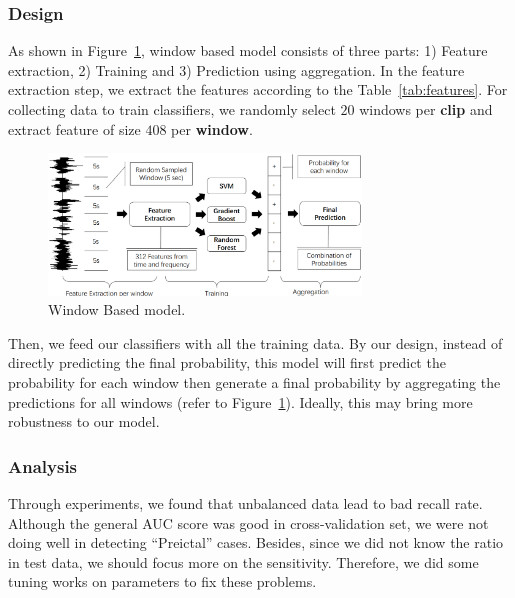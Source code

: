 \documentclass[letterpaper,12pt]{article}
\begin{document}
\subsubsection{Design}
As shown in Figure~\ref{fig:m1}, window based model consists of three parts: 1)
Feature extraction, 2) Training and 3) Prediction using aggregation. In the feature
extraction step, we extract the features according to the
Table~\ref{tab:features}. For collecting data to train classifiers, we randomly select
$20$ windows per \textbf{clip} and extract feature of size $408$ per
\textbf{window}.


\begin{figure}[h]
  \centering
    \includegraphics[width=0.74\textwidth]{images/m1.png}
  \caption{Window Based model.}
  \label{fig:m1}
\end{figure}
Then, we feed our classifiers with all the training data. By our design, instead
of directly predicting the final probability, this model will first predict the
probability for each window then generate a final probability by aggregating the
predictions for all windows (refer to Figure~\ref{fig:m1}). Ideally, this may
bring more robustness to our model.


\subsubsection{Analysis}\label{sec:ruifan_analysis}
Through experiments, we found that unbalanced data lead to bad
recall rate. Although the general AUC score was good in cross-validation set, we
were not doing well in detecting ``Preictal'' cases. Besides, since we did not know the
ratio in test data, we should focus more on the sensitivity. Therefore, we did
some tuning works on parameters to fix these problems.
\end{document}
